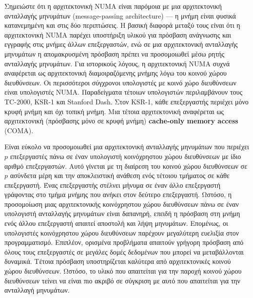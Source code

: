 \documentclass[12pt,a4paper]{article}
\begin{document}
Σημειώστε ότι η αρχιτεκτονική \foreignlanguage{english}{NUMA} είναι παρόμοια με μια αρχιτεκτονική 
ανταλλαγής μηνυμάτων (\foreignlanguage{english}{message-passing architecture}) — η μνήμη είναι φυσικά 
κατανεμημένη και στις δύο περιπτώσεις. Η βασική διαφορά μεταξύ τους είναι 
ότι η αρχιτεκτονική \foreignlanguage{english}{NUMA} παρέχει υποστήριξη υλικού για πρόσβαση ανάγνωσης 
και εγγραφής στις μνήμες άλλων επεξεργαστών, ενώ σε μια αρχιτεκτονική 
ανταλλαγής μηνυμάτων η απομακρυσμένη πρόσβαση πρέπει να προσομοιωθεί μέσω 
ρητής ανταλλαγής μηνυμάτων. Για ιστορικούς λόγους, η αρχιτεκτονική \foreignlanguage{english}{NUMA} 
συχνά αναφέρεται ως αρχιτεκτονική διαμοιραζόμενης μνήμης λόγω του κοινού 
χώρου διευθύνσεων. Οι περισσότεροι σύγχρονοι υπολογιστές με κοινό χώρο 
διευθύνσεων είναι υπολογιστές \foreignlanguage{english}{NUMA}. Παραδείγματα τέτοιων υπολογιστών 
περιλαμβάνουν τους \foreignlanguage{english}{TC-2000, KSR-1} και \foreignlanguage{english}{Stanford Dash}. Στον \foreignlanguage{english}{KSR-1}, κάθε 
επεξεργαστής περιέχει μόνο κρυφή μνήμη και όχι τοπική μνήμη. Μια τέτοια 
αρχιτεκτονική αναφέρεται ως αρχιτεκτονική (πρόσβασης μόνο σε κρυφή μνήμη) \foreignlanguage{english}{\textbf{cache-only memory 
access} (COMA)}.

Είναι εύκολο να προσομοιωθεί μια αρχιτεκτονική ανταλλαγής μηνυμάτων που
περιέχει \(p\) επεξεργαστές πάνω σε έναν υπολογιστή κοινόχρηστου χώρου 
διευθύνσεων με ίδιο αριθμό επεξεργαστών. Αυτό γίνεται με τη διαίρεση του 
κοινού χώρου διευθύνσεων σε \(p\) ασύνδετα μέρη και την αποκλειστική 
ανάθεση ενός τέτοιου τμήματος σε κάθε επεξεργαστή. Ένας επεξεργαστής 
στέλνει μήνυμα σε έναν άλλο επεξεργαστή γράφοντας στο τμήμα μνήμης που 
ανήκει στον δεύτερο επεξεργαστή. Ωστόσο, η προσομοίωση μιας αρχιτεκτονικής 
κοινόχρηστου χώρου διευθύνσεων πάνω σε έναν υπολογιστή ανταλλαγής μηνυμάτων 
είναι δαπανηρή, επειδή η πρόσβαση στη μνήμη ενός άλλου επεξεργαστή 
απαιτεί αποστολή και λήψη μηνυμάτων. Επομένως, οι υπολογιστές κοινόχρηστου 
χώρου διευθύνσεων παρέχουν μεγαλύτερη ευελιξία στον προγραμματισμό. 
Επιπλέον, ορισμένα προβλήματα απαιτούν γρήγορη πρόσβαση από όλους τους 
επεξεργαστές σε μεγάλες δομές δεδομένων που μπορεί να μεταβάλλονται 
δυναμικά. Τέτοια πρόσβαση υποστηρίζεται καλύτερα από αρχιτεκτονικές 
κοινού χώρου διευθύνσεων. Ωστόσο, το υλικό που απαιτείται για την παροχή 
κοινού χώρου διευθύνσεων τείνει να είναι πιο ακριβό σε σύγκριση με αυτό 
που απαιτείται για την ανταλλαγή μηνυμάτων.
\end{document}
